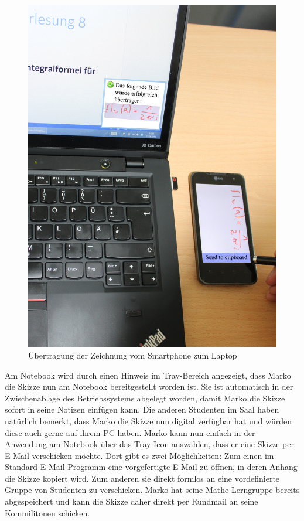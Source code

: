 \documentclass{chi-ext}
\begin{document}
\begin{figure}
  \centering
  \includegraphics[width=\linewidth]{img/szenario/szenario_3.jpg}
  \caption{Übertragung der Zeichnung vom Smartphone zum Laptop}
  \label{fig:mockup_startscreen}
\end{figure}

Am Notebook wird durch einen Hinweis im Tray-Bereich angezeigt, dass Marko die Skizze nun am Notebook bereitgestellt worden ist. Sie ist automatisch in der Zwischenablage des Betriebssystems abgelegt worden, damit Marko die Skizze sofort in seine Notizen einfügen kann. 
Die anderen Studenten im Saal haben natürlich bemerkt, dass Marko die Skizze nun digital verfügbar hat und würden diese auch gerne auf ihrem PC haben. Marko kann nun einfach in der Anwendung am Notebook über das Tray-Icon auswählen, dass er eine Skizze per E-Mail verschicken möchte. Dort gibt es zwei Möglichkeiten: Zum einen im Standard E-Mail Programm eine vorgefertigte E-Mail zu öffnen, in deren Anhang die Skizze kopiert wird. Zum anderen sie direkt formlos an eine vordefinierte Gruppe von Studenten zu verschicken. Marko hat seine Mathe-Lerngruppe bereits abgespeichert und kann die Skizze daher direkt per Rundmail an seine Kommilitonen schicken.
\end{document}
